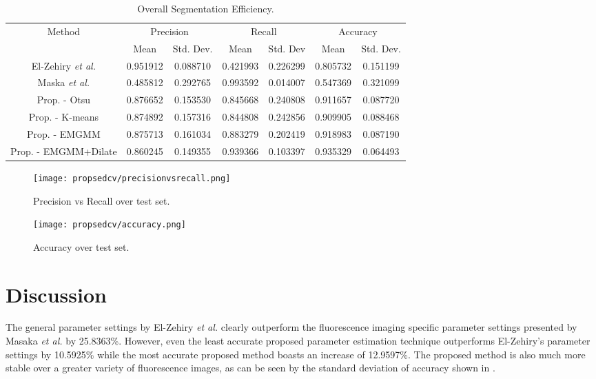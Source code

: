 \begin{longtable}{|c|c|c|c|c|c|c|}
	\caption{Overall Segmentation Efficiency.} \label{tab:overallsegmentationefficiency}\\
	\hline 
	\multirow{2}{*}{Method} & \multicolumn{2}{c|}{Precision} & \multicolumn{2}{c|}{Recall} & \multicolumn{2}{c|}{Accuracy}  \\ 
	\hhline{~------}
	& Mean & Std. Dev. & Mean & Std. Dev & Mean & Std. Dev.  \\ 
	\hline	El-Zehiry \textit{et al.} \citep{ElZehiry2007}	&	0.951912	&	0.088710	&	0.421993	&	0.226299	&	0.805732	&	0.151199	\\
	\hline \rowcolor{bad}	Maska \textit{et al.} \citep{Maska2013}	&	0.485812	&	0.292765	&	0.993592	&	0.014007	&	0.547369	&	0.321099\\
	\hline	Prop. - Otsu	&	0.876652	&	0.153530	&	0.845668	&	0.240808	&	0.911657	&	0.087720	\\
	\hline	Prop. - K-means	&	0.874892	&	0.157316	&	0.844808	&	0.242856	&	0.909905	&	0.088468	\\
	\hline	Prop. - EMGMM	&	0.875713	&	0.161034	&	0.883279	&	0.202419	&	0.918983	&	0.087190	\\
	\hline \rowcolor{closest}	Prop. - EMGMM+Dilate	&	0.860245	&	0.149355	&	0.939366	&	0.103397	&	0.935329	&	0.064493	\\
	\hline
\end{longtable} 

\begin{figure}[!h]
	\centering
	\texttt{[image: propsedcv/precisionvsrecall.png]}
	\caption{Precision vs Recall over test set.}
	\label{fig:precisionvsrecall}
\end{figure}

\begin{figure}[!t]
	\centering
	\texttt{[image: propsedcv/accuracy.png]}
	\caption{Accuracy over test set.}
	\label{fig:accuracyovertestset}
\end{figure}


\section{Discussion}
\label{sec:cvgc_discussion}

The general parameter settings by El-Zehiry \textit{et al.} \citep{ElZehiry2007} clearly outperform the fluorescence imaging specific parameter settings presented by Masaka \textit{et al.} \citep{Maska2013} by 25.8363\%. However, even the least accurate proposed parameter estimation technique outperforms El-Zehiry's parameter settings by 10.5925\% while the most accurate proposed method boasts an increase of 12.9597\%. The proposed method is also much more stable over a greater variety of fluorescence images, as can be seen by the standard deviation of accuracy shown in .

